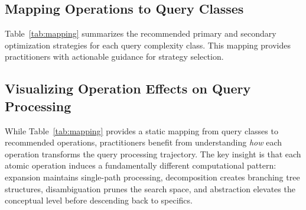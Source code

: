 \documentclass{article}
\begin{document}
\subsection{Mapping Operations to Query Classes}

Table~\ref{tab:mapping} summarizes the recommended primary and secondary optimization strategies for each query complexity class. This mapping provides practitioners with actionable guidance for strategy selection.

\begin{table}[t]
    \centering
    \scriptsize
    \caption{Mapping query optimization operations to query complexity classes. $\checkmark\checkmark$ indicates primary recommendation; $\checkmark$ indicates secondary utility; $\times$ indicates limited applicability.}
    \label{tab:mapping}
\end{table}

\subsection{Visualizing Operation Effects on Query Processing}

While Table~\ref{tab:mapping} provides a static mapping from query classes to recommended operations, practitioners benefit from understanding \textit{how} each operation transforms the query processing trajectory. The key insight is that each atomic operation induces a fundamentally different computational pattern: expansion maintains single-path processing, decomposition creates branching tree structures, disambiguation prunes the search space, and abstraction elevates the conceptual level before descending back to specifics.
\end{document}
